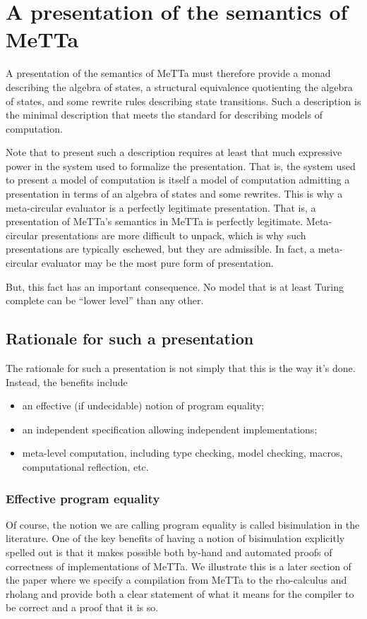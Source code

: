 \section{A presentation of the semantics of MeTTa}

A presentation of the semantics of MeTTa must therefore provide a monad describing the algebra of states, a structural equivalence quotienting the algebra of states, and some rewrite rules describing state transitions. Such a description is the minimal description that meets the standard for describing models of computation. 


Note that to present such a description requires at least that much expressive power in the system used to formalize the presentation. That is, the system used to present a model of computation is itself a model of computation admitting a presentation in terms of an algebra of states and some rewrites. This is why a meta-circular evaluator is a perfectly legitimate presentation. That is, a presentation of MeTTa’s semantics in MeTTa is perfectly legitimate. Meta-circular presentations are more difficult to unpack, which is why such presentations are typically eschewed, but they are admissible. In fact, a meta-circular evaluator may be the most pure form of presentation.


But, this fact has an important consequence. No model that is at least Turing complete can be “lower level” than any other.

\subsection{Rationale for such a presentation}

The rationale for such a presentation is not simply that this is the way it’s done. Instead, the benefits include

\begin{itemize}
  \item an effective (if undecidable) notion of program equality;
  \item an independent specification allowing independent implementations;
  \item meta-level computation, including type checking, model checking, macros, computational reflection, etc.
\end{itemize}

\subsubsection{Effective program equality}
Of course, the notion we are calling program equality is called bisimulation in the literature. One of the key benefits of having a notion of bisimulation explicitly spelled out is that it makes possible both by-hand and automated proofs of correctness of implementations of MeTTa. We illustrate this is a later section of the paper where we specify a compilation from MeTTa to the rho-calculus and rholang and provide both a clear statement of what it means for the compiler to be correct and a proof that it is so.

